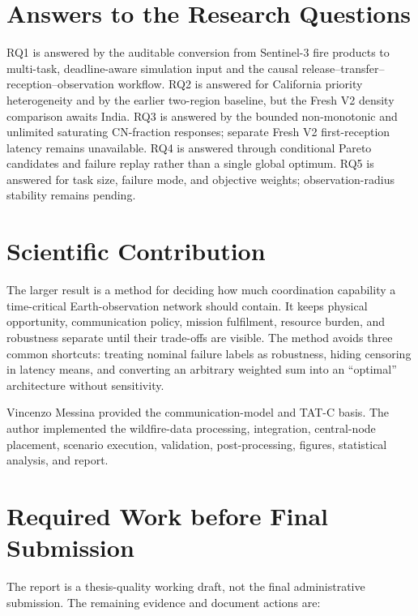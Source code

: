 \section{Answers to the Research Questions}

RQ1 is answered by the auditable conversion from Sentinel-3 fire products to multi-task, deadline-aware simulation input and the causal release--transfer--reception--observation workflow. RQ2 is answered for California priority heterogeneity and by the earlier two-region baseline, but the Fresh V2 density comparison awaits India. RQ3 is answered by the bounded non-monotonic and unlimited saturating CN-fraction responses; separate Fresh V2 first-reception latency remains unavailable. RQ4 is answered through conditional Pareto candidates and failure replay rather than a single global optimum. RQ5 is answered for task size, failure mode, and objective weights; observation-radius stability remains pending.

\section{Scientific Contribution}

The larger result is a method for deciding how much coordination capability a time-critical Earth-observation network should contain. It keeps physical opportunity, communication policy, mission fulfilment, resource burden, and robustness separate until their trade-offs are visible. The method avoids three common shortcuts: treating nominal failure labels as robustness, hiding censoring in latency means, and converting an arbitrary weighted sum into an ``optimal'' architecture without sensitivity.

Vincenzo Messina provided the communication-model and TAT-C basis. The author implemented the wildfire-data processing, integration, central-node placement, scenario execution, validation, post-processing, figures, statistical analysis, and report.

\section{Required Work before Final Submission}

The report is a thesis-quality working draft, not the final administrative submission. The remaining evidence and document actions are:

